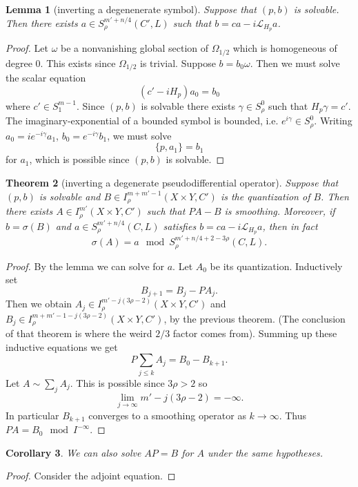 \documentclass[reqno,12pt,letterpaper]{amsart}
\newtheorem{theorem}{Theorem}[section]
\newtheorem{lemma}[theorem]{Lemma}
\newtheorem{corollary}[theorem]{Corollary}
\theoremstyle{definition}
\begin{document}
\begin{lemma}[inverting a degenenerate symbol]
Suppose that $(p, b)$ is solvable.
Then there exists $a \in S^{m' + n/4}_\rho(C', L)$ such that $b = ca - i\mathcal L_{H_p}a$.
\end{lemma}
\begin{proof}
Let $\omega$ be a nonvanishing global section of $\Omega_{1/2}$ which is homogeneous of degree $0$.
This exists since $\Omega_{1/2}$ is trivial.
Suppose $b = b_0\omega$.
Then we must solve the scalar equation
$$(c' - iH_p)a_0 = b_0$$
where $c' \in S^{m - 1}_1$.
Since $(p, b) $ is solvable there exists $\gamma \in S^0_\rho$ such that $H_p\gamma = c'$.
The imaginary-exponential of a bounded symbol is bounded, i.e. $e^{i\gamma} \in S^0_\rho$.
Writing $a_0 = ie^{-i\gamma}a_1$, $b_0 = e^{-i\gamma}b_1$, we must solve
$$\{p, a_1\} = b_1$$
for $a_1$, which is possible since $(p, b)$ is solvable.
\end{proof}

\begin{theorem}[inverting a degenerate pseudodifferential operator]
Suppose that $(p, b)$ is solvable and $B \in I^{m + m' - 1}_\rho(X \times Y, C')$ is the quantization of $B$.
Then there exists $A \in I^{m'}_\rho(X \times Y, C')$ such that $PA - B$ is smoothing.
Moreover, if $b = \sigma(B)$ and $a \in S^{m' + n/4}_\rho(C, L)$ satisfies $b = ca - i\mathcal L_{H_p}a$, then in fact
$$\sigma(A) = a \mod S^{m' + n/4 + 2 - 3\rho}_\rho(C, L).$$
\end{theorem}
\begin{proof}
By the lemma we can solve for $a$. Let $A_0$ be its quantization. Inductively set
$$B_{j + 1} = B_j - PA_j.$$
Then we obtain $A_j \in I^{m' - j(3\rho - 2)}_\rho(X \times Y, C')$ and $B_j \in I^{m + m' - 1 - j(3\rho - 2)}_\rho(X \times Y, C')$, by the previous theorem.
(The conclusion of that theorem is where the weird $2/3$ factor comes from).
Summing up these inductive equations we get
$$P\sum_{j \leq k} A_j = B_0 - B_{k + 1}.$$
Let $A \sim \sum_j A_j$. This is possible since $3\rho > 2$ so
$$\lim_{j \to \infty} m' - j(3\rho - 2) = -\infty.$$
In particular $B_{k + 1}$ converges to a smoothing operator as $k \to \infty$.
Thus $PA = B_0 \mod I^{-\infty}$.
\end{proof}

\begin{corollary}
We can also solve $AP = B$ for $A$ under the same hypotheses.
\end{corollary}
\begin{proof}
Consider the adjoint equation.
\end{proof}
\end{document}
